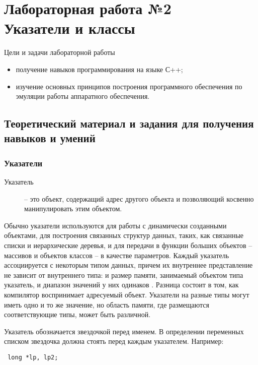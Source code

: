 \documentclass[a4paper,report,14pt]{ncc}
\begin{document}
\section*{Лабораторная работа №2 \\ Указатели и классы}

Цели и задачи лабораторной работы

\begin{itemize}
 \item получение навыков программирования на языке С++;
 \item изучение основных принципов построения программного обеспечения по эмуляции работы аппаратного обеспечения.
\end{itemize}


\subsection{Теоретический материал и задания для получения навыков и умений}



\subsubsection{Указатели}

\begin{description}
 \item[Указатель] – это объект, содержащий адрес другого объекта и позволяющий косвенно манипулировать этим объектом.
 \end{description}
 
Обычно указатели используются для работы с динамически созданными объектами, для построения связанных структур данных, таких, как связанные списки и иерархические деревья, и для передачи в функции больших объектов – массивов и объектов классов – в качестве параметров.
Каждый указатель ассоциируется с некоторым типом данных, причем их внутреннее представление не зависит от внутреннего типа: и размер памяти, занимаемый объектом типа указатель, и диапазон значений у них одинаков . Разница состоит в том, как компилятор воспринимает адресуемый объект. Указатели на разные типы могут иметь одно и то же значение, но область памяти, где размещаются соответствующие типы, может быть различной.

Указатель обозначается звездочкой перед именем. В определении переменных списком звездочка должна стоять перед каждым указателем. Например:

\begin{verbatim}
 long *lp, lp2;
\end{verbatim}
\end{document}
